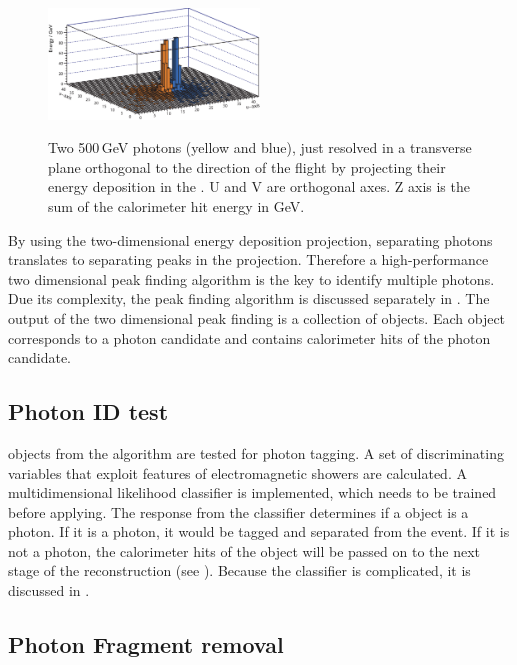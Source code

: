 \begin{figure}[tbph]
\centering
{\includegraphics[width=0.5\textwidth]{photon/peakFindingMod}}
\caption[Example of projecting a large photon clusters containing two photons.]
{Two 500\,GeV photons (yellow and blue), just resolved in a transverse plane orthogonal to the direction of the flight  by projecting their energy deposition in the \ECAL. U and V are orthogonal axes. Z axis is the sum of the calorimeter hit energy in GeV.}
\label{fig:photonPeakFinding}
\end{figure}

By using the two-dimensional energy deposition projection, separating photons translates to separating peaks in the projection. Therefore a high-performance two dimensional peak finding algorithm is the key to identify multiple photons. Due its complexity, the peak finding algorithm is discussed separately in . The output of the two dimensional peak finding is a collection of \ShowerPeak objects. Each \ShowerPeak object corresponds to a photon candidate and contains calorimeter hits of the photon candidate.

\subsection{Photon ID test}
\label{sec:photonIDtest}

\ShowerPeak objects from the \peakFinding algorithm are tested for photon tagging.  A set of discriminating variables that exploit features of electromagnetic showers are calculated. A multidimensional likelihood classifier is implemented, which needs to be trained before applying. The response from the classifier determines if a \ShowerPeak object is a photon. If it is a photon, it would be tagged and separated from the event. If it is not a photon, the calorimeter hits of the \ShowerPeak object will be passed on to the next stage of the reconstruction (see ). Because the classifier is complicated, it is discussed in .

\subsection{Photon Fragment removal}
\label{sec:photonRecoFragRemoval}

